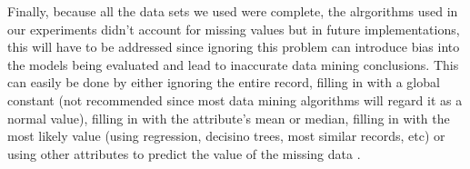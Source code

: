\documentclass{sig-alternate}
\begin{document}
Finally, because all the data sets we used were complete, the alrgorithms used in our experiments didn't account for missing values but in future implementations, this will have to be addressed since ignoring this problem can introduce bias into the models being evaluated and lead to inaccurate data mining conclusions. This can easily be done by either ignoring the entire record, filling in with a global constant (not recommended since most data mining algorithms will regard it as a normal value), filling in with the attribute's mean or median, filling in with the most likely value (using regression, decisino trees, most similar records, etc) or using other attributes to predict the value of the missing data \cite{missingdata}.

%

%
%
\end{document}
